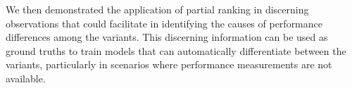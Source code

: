 \documentclass[acmsmall,screen, review]{acmart}
\begin{document}
%

We then demonstrated the application of partial ranking in discerning observations that could facilitate in identifying the causes of performance differences among the variants. This discerning information can be used as ground truths to train models that can automatically differentiate between the variants, particularly in scenarios where performance measurements are not available. 

\end{document}
